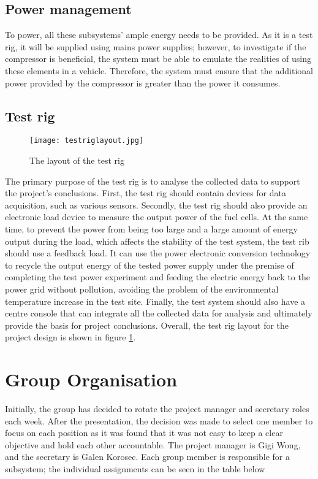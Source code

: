 \documentclass[a4paper,11pt]{article}
\begin{document}
\subsection{Power management}
To power, all these subsystems' ample energy needs to be provided.  As it is a test rig, it will be supplied using mains power supplies; however, to investigate if the compressor is beneficial, the system must be able to emulate the realities of using these elements in a vehicle. Therefore, the system must ensure that the additional power provided by the compressor is greater than the power it consumes.

\subsection{Test rig}

\begin{figure}[h]
    \texttt{[image: testriglayout.jpg]}
    \caption{The layout of the test rig}
    \centering
    \label{fig:testriglayout}  
\end{figure}

The primary purpose of the test rig is to analyse the collected data to support the project's conclusions. First, the test rig should contain devices for data acquisition, such as various sensors. Secondly, the test rig should also provide an electronic load device to measure the output power of the fuel cells. At the same time, to prevent the power from being too large and a large amount of energy output during the load, which affects the stability of the test system, the test rib should use a feedback load. It can use the power electronic conversion technology to recycle the output energy of the tested power supply under the premise of completing the test power experiment and feeding the electric energy back to the power grid without pollution, avoiding the problem of the environmental temperature increase in the test site. Finally, the test system should also have a centre console that can integrate all the collected data for analysis and ultimately provide the basis for project conclusions. Overall, the test rig layout for the project design is shown in figure \ref{fig:testriglayout}.

\section{Group Organisation}
Initially, the group has decided to rotate the project manager and secretary roles each week. After the presentation, the decision was made to select one member to focus on each position as it was found that it was not easy to keep a clear objective and hold each other accountable. The project manager is Gigi Wong, and the secretary is Galen Korosec. Each group member is responsible for a subsystem; the individual assignments can be seen in the table below
\end{document}
